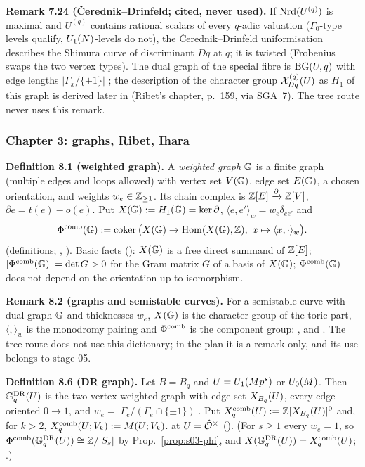 \medskip
\noindent{}\label{rpt:rem:s02-CD}\textbf{Remark 7.24 (\v{C}erednik--Drinfeld; cited, never used).}
If $\mathrm{Nrd}(U^{(q)})$ is maximal and $U^{(q)}$ contains rational scalars of every $q$-adic valuation ($\Gamma_0$-type levels qualify,
$U_1(N)$-levels do not), the \v{C}erednik--Drinfeld uniformisation \cite[Ch.~III, Th\'eor\`eme~5.2, pp.~140--141]{BC} describes the
Shimura curve of discriminant $Dq$ at $q$; it is twisted (Frobenius swaps the two vertex types). The dual graph of the special fibre is
$\mathrm{BG}(U,q)$ with edge lengths $|\Gamma_x/\{\pm1\}|$ \cite[Ch.~III, 5.3.3, p.~143; 5.4.3--5.4.4, pp.~145--146]{BC}; the description of the
character group $\mathcal{X}^{(q)}_{Dq}(U)$ as $H_1$ of this graph is derived later in \cite{BC} (Ribet's chapter, p.~159, via SGA~7). \stcited{}
The tree route never uses this remark.

\subsubsection*{Chapter 3: graphs, Ribet, Ihara}

\noindent{}\label{rpt:def:s03-graph}\textbf{Definition 8.1 (weighted graph).}
A \emph{weighted graph} $\mathbb{G}$ is a finite graph (multiple edges and loops allowed) with vertex set $V(\mathbb{G})$, edge set $E(\mathbb{G})$, a
chosen orientation, and weights $w_e\in\mathbb{Z}_{\ge1}$. Its chain complex is $\mathbb{Z}[E]\xrightarrow\partial\mathbb{Z}[V]$, $\partial e=t(e)-o(e)$. Put
$X(\mathbb{G}):=H_1(\mathbb{G})=\ker\partial$, $\langle e,e'\rangle_w=w_e\delta_{ee'}$ and
\[\Phicomb(\G):=\coker\big(X(\G)\to\Hom(X(\G),\Z),\ x\mapsto\langle x,\cdot\rangle_w\big).\]
 \stformal{} (definitions; , ).
Basic facts (\stproved): $X(\mathbb{G})$ is a free direct summand of $\mathbb{Z}[E]$; $|\Phi^{\mathrm{comb}}(\mathbb{G})|=\det G>0$ for the Gram matrix $G$ of a basis of
$X(\mathbb{G})$; $\Phi^{\mathrm{comb}}(\mathbb{G})$ does not depend on the orientation up to isomorphism.

\medskip
\noindent{}\label{rpt:rem:s03-grothendieck}\textbf{Remark 8.2 (graphs and semistable curves).}
For a semistable curve with dual graph $\mathbb{G}$ and thicknesses $w_e$, $X(\mathbb{G})$ is the character group of the toric part, $\langle,\rangle_w$ is
the monodromy pairing and $\Phi^{\mathrm{comb}}$ is the component group: \cite[IX]{SGA7} \stcited{}, and \cite[Prop.~2.2, Thm.~2.3, p.~436; weighted
form pp.~437--438]{Ri90}. The tree route does not use this dictionary; in the plan it is a remark only, and its use belongs to stage 05.

\medskip
\noindent{}\label{rpt:def:s03-DR}\textbf{Definition 8.6 (DR graph).}
Let $B=B_q$ and $U=U_1(Mp^s)$ or $U_0(M)$. Then $\mathbb{G}^{\mathrm{DR}}_q(U)$ is the two-vertex weighted graph with edge set $X_{B_q}(U)$, every edge
oriented $0\to1$, and $w_e=|\Gamma_e/(\Gamma_e\cap\{\pm1\})|$. Put $X^{\mathrm{comb}}_q(U):=\mathbb{Z}[X_{B_q}(U)]^0$ and, for $k>2$,
$X^{\mathrm{comb}}_q(U;V_k):=M(U;V_k)$.  \stformal{} at $U=\hat{\mathcal{O}}^\times$ ().
(For $s\ge1$ every $w_e=1$, so $\Phi^{\mathrm{comb}}(\mathbb{G}^{\mathrm{DR}}_q(U))\cong\mathbb{Z}/|S_s|$ by Prop.~\ref{prop:s03-phi}, and $X(\mathbb{G}^{\mathrm{DR}}_q(U))=X^{\mathrm{comb}}_q(U)$; \stproved.)

